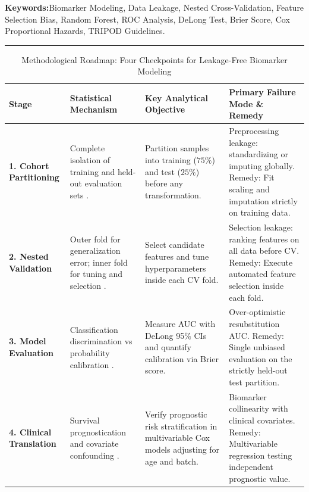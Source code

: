 \documentclass[11pt,twoside,openright]{book}
\begin{document}
\noindent
\textbf{Keywords:}\enspace Biomarker Modeling, Data Leakage, Nested Cross-Validation, Feature Selection Bias, Random Forest, ROC Analysis, DeLong Test, Brier Score, Cox Proportional Hazards, TRIPOD Guidelines.

\vspace{0.8em}
\noindent\rule{\textwidth}{0.4pt}


\begin{table}[ht]
\centering
\caption{Methodological Roadmap: Four Checkpoints for Leakage-Free Biomarker Modeling}
\label{tab:biomarker_roadmap}
\small
\begin{tabularx}{\textwidth}{l p{3.8cm} p{4.2cm} X}
\toprule
\textbf{Stage} & \textbf{Statistical Mechanism} & \textbf{Key Analytical Objective} & \textbf{Primary Failure Mode \& Remedy} \\
\midrule
\textbf{1. Cohort Partitioning} & Complete isolation of training and held-out evaluation sets \cite{collins2015transparent, kuhn2013applied}. & Partition samples into training ($75\%$) and test ($25\%$) before any transformation. & Preprocessing leakage: standardizing or imputing globally. Remedy: Fit scaling and imputation strictly on training data. \\
\addlinespace
\textbf{2. Nested Validation} & Outer fold for generalization error; inner fold for tuning and selection \cite{varma2006bias, ambroise2002selection}. & Select candidate features and tune hyperparameters inside each CV fold. & Selection leakage: ranking features on all data before CV. Remedy: Execute automated feature selection inside each fold. \\
\addlinespace
\textbf{3. Model Evaluation} & Classification discrimination vs probability calibration \cite{delong1988comparing, brier1950verification, robin2011proc, steckelbroeck2019guidelines}. & Measure AUC with DeLong 95\% CIs and quantify calibration via Brier score. & Over-optimistic resubstitution AUC. Remedy: Single unbiased evaluation on the strictly held-out test partition. \\
\addlinespace
\textbf{4. Clinical Translation} & Survival prognostication and covariate confounding \cite{cox1972regression, mcshane2005reporting, collins2024tripod}. & Verify prognostic risk stratification in multivariable Cox models adjusting for age and batch. & Biomarker collinearity with clinical covariates. Remedy: Multivariable regression testing independent prognostic value. \\
\bottomrule
\end{tabularx}
\end{table}
\end{document}
